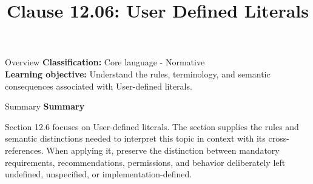 \documentclass[10pt,letterpaper]{article}
\title{Clause 12.06: User Defined Literals}
\author{}
\date{}
\begin{document}
\maketitle
\begin{CornellOverviewBox}{Overview}
\textbf{Classification:} Core language - Normative\\[2pt]
\textbf{Learning objective:} Understand the rules, terminology, and semantic consequences associated with User-defined literals.
\end{CornellOverviewBox}\begin{CornellSummaryBox}{Summary}
{\sffamily\bfseries\color{Accent} Summary}\par\vspace{3pt}Section 12.6 focuses on User-defined literals. The section supplies the rules and semantic distinctions needed to interpret this topic in context with its cross-references. When applying it, preserve the distinction between mandatory requirements, recommendations, permissions, and behavior deliberately left undefined, unspecified, or implementation-defined.
\end{CornellSummaryBox}
\end{document}
